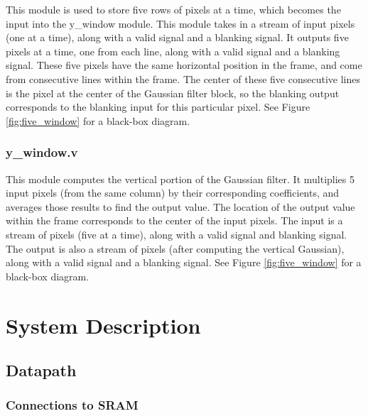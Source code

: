 \documentclass[12pt]{article}
\begin{document}

This module is used to store five rows of pixels at a time, which becomes the 
input into the y\_window module. This module takes in a stream of input pixels 
(one at a time), along with a valid signal and a blanking signal. It outputs 
five pixels at a time, one from each line, along with a valid signal and a 
blanking signal. These five pixels have the same horizontal position in the 
frame, and come from consecutive lines within the frame. The center of these 
five consecutive lines is the pixel at the center of the Gaussian filter block, 
so the blanking output corresponds to the blanking input for this particular 
pixel. See Figure \ref{fig:five_window} for a 
black-box diagram.


\subsubsection{y\_window.v}


This module computes the vertical portion of the Gaussian filter. It multiplies 
5 input pixels (from the same column) by their corresponding coefficients, and 
averages those results to find the output value. The location of the output 
value within the frame corresponds to the center of the input pixels. The input 
is a stream of pixels (five at a time), along with a valid signal and blanking 
signal. The output is also a stream of pixels (after computing the vertical 
Gaussian), along with a valid signal and a blanking signal. See Figure \ref{fig:five_window} for a 
black-box diagram.


\section{System Description}

\subsection{Datapath}

\subsubsection{Connections to SRAM}
\end{document}
